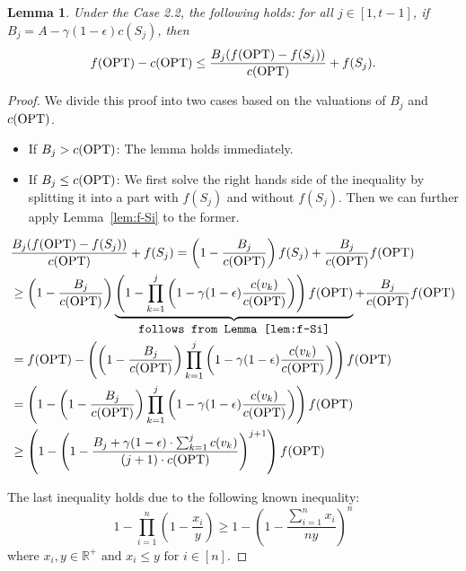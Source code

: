 \documentclass[10pt]{article} %
\newtheorem{lemma}[theorem]{Lemma}
\theoremstyle{remark}
\newcommand{\OPT}{{\rm OPT}}
\begin{document}
\begin{lemma} 
\label{lem:h-upper-bound}
Under the Case 2.2,
the following holds: for all $j\in [1,t-1]$, if $B_j=A-\gamma(1-\epsilon) c(S_{j})$, then
\[ 
   f(\OPT) - c(\OPT) \leq \frac{B_j(f(\OPT) - f(S_{j}))}{c(\OPT)} +f(S_{j}). 
\]
\end{lemma}

\begin{proof}
We divide this proof into two cases based on the valuations of $B_j$ and $c(\OPT)$.

\begin{itemize}
    \item If \textbf{$B_j > c(\OPT)$}: The lemma holds immediately.
    \item If \textbf{$B_j \leq c(\OPT)$}: We first solve the right hands side of the inequality by splitting it into a part with $f(S_{j})$ and without $f(S_{j})$. Then we can further apply Lemma~\ref{lem:f-Si} to the former.
\end{itemize}
\begin{align*}
    & \displaystyle\frac{B_j(f(\OPT) - f(S_{j}))}{c(\OPT)} +f(S_{j}) = \displaystyle\left(1-\frac{B_j}{c(\OPT)}\right)f(S_{j}) + \frac{B_j}{c(\OPT)}f(\OPT)\\
    &\geq  \displaystyle\left(1-\frac{B_j}{c(\OPT)}\right)\underbrace{\left(   1- \prod_{k=1}^{j}  \left(1- \gamma(1-\epsilon) \frac{c(v_k)}{c(\OPT)} \right)   \right) f(\OPT)}_{\mbox{\tt follows from Lemma~\ref{lem:f-Si}}} +\displaystyle\frac{B_j}{c(\OPT)}f(\OPT)\\
        &=f(\OPT) - \displaystyle\left(\left(1-\frac{B_j}{c(\OPT)}\right)\prod_{k=1}^{j} \left(1- \gamma(1-\epsilon) \frac{c(v_k)}{c(\OPT)} \right)\right)f(\OPT)\\
        &=\left( 1- \displaystyle\left(1-\frac{B_j}{c(\OPT)}\right)\prod_{k=1}^{j} \left(1- \gamma(1-\epsilon) \frac{c(v_k)}{c(\OPT)} \right) \right)f(\OPT)\\
        &\geq \left( 1- \displaystyle\left(1- \frac{B_j+\gamma(1-\epsilon)\cdot \sum_{k=1}^{j}c(v_k)}{(j+1)\cdot c(\OPT)} \right)^{j+1} \right)f(\OPT)
\end{align*}

The last inequality holds due to the following known inequality: 
\begin{equation}
1-\prod_{i=1}^n\left(1-\frac{x_i}{y}\right) \geq 1-\left(1-\frac{\sum_{i=1}^n x_i}{n y}\right)^n
\label{eq:prodsum}
\end{equation}
where $x_i, y \in \mathbb{R}^{+} \mbox{ and } x_i \leq y \mbox{ for } i \in [n]$.


\end{proof}
\end{document}

